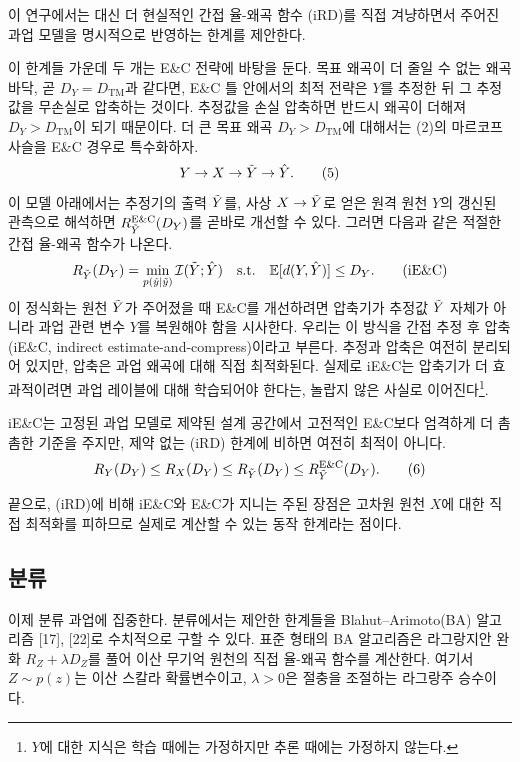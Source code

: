 이 연구에서는 대신 더 현실적인 간접 율-왜곡 함수 (iRD)를 직접 겨냥하면서 주어진 과업 모델을 명시적으로 반영하는 한계를 제안한다.

이 한계들 가운데 두 개는 E\&C 전략에 바탕을 둔다. 목표 왜곡이 더 줄일 수 없는 왜곡 바닥, 곧 $D_Y=D_{\mathrm{TM}}$과 같다면, E\&C 틀 안에서의 최적 전략은 $Y$를 추정한 뒤 그 추정값을 무손실로 압축하는 것이다. 추정값을 손실 압축하면 반드시 왜곡이 더해져 $D_Y>D_{\mathrm{TM}}$이 되기 때문이다. 더 큰 목표 왜곡 $D_Y>D_{\mathrm{TM}}$에 대해서는 (2)의 마르코프 사슬을 E\&C 경우로 특수화하자.
\begin{equation}
Y\to X\to\tilde{Y}\to\hat{Y}.\tag{5}
\end{equation}
이 모델 아래에서는 추정기의 출력 $\tilde{Y}$를, 사상 $X\to\tilde{Y}$로 얻은 원격 원천 $Y$의 갱신된 관측으로 해석하면 $R_{\tilde{Y}}^{\mathrm{E\&C}}(D_Y)$를 곧바로 개선할 수 있다. 그러면 다음과 같은 적절한 간접 율-왜곡 함수가 나온다.
\begin{equation}
R_{\tilde{Y}}(D_Y)=\min_{p(\hat y|\tilde y)}\mathcal{I}(\tilde{Y};\hat{Y})\quad\text{s.t.}\quad\mathbb{E}[d(Y,\hat{Y})]\le D_Y.\tag{iE\&C}
\end{equation}
이 정식화는 원천 $\tilde{Y}$가 주어졌을 때 E\&C를 개선하려면 압축기가 추정값 $\tilde{Y}$ 자체가 아니라 과업 관련 변수 $Y$를 복원해야 함을 시사한다. 우리는 이 방식을 간접 추정 후 압축(iE\&C, indirect estimate-and-compress)이라고 부른다. 추정과 압축은 여전히 분리되어 있지만, 압축은 과업 왜곡에 대해 직접 최적화된다. 실제로 iE\&C는 압축기가 더 효과적이려면 과업 레이블에 대해 학습되어야 한다는, 놀랍지 않은 사실로 이어진다\footnote{$Y$에 대한 지식은 학습 때에는 가정하지만 추론 때에는 가정하지 않는다.}.

iE\&C는 고정된 과업 모델로 제약된 설계 공간에서 고전적인 E\&C보다 엄격하게 더 촘촘한 기준을 주지만, 제약 없는 (iRD) 한계에 비하면 여전히 최적이 아니다.
\begin{equation}
R_Y(D_Y)\le R_X(D_Y)\le R_{\tilde{Y}}(D_Y)\le R_{\tilde{Y}}^{\mathrm{E\&C}}(D_Y).\tag{6}
\end{equation}

끝으로, (iRD)에 비해 iE\&C와 E\&C가 지니는 주된 장점은 고차원 원천 $X$에 대한 직접 최적화를 피하므로 실제로 계산할 수 있는 동작 한계라는 점이다.

\subsection{분류}
이제 분류 과업에 집중한다. 분류에서는 제안한 한계들을 Blahut--Arimoto(BA) 알고리즘 [17], [22]로 수치적으로 구할 수 있다. 표준 형태의 BA 알고리즘은 라그랑지안 완화 $R_Z+\lambda D_Z$를 풀어 이산 무기억 원천의 직접 율-왜곡 함수를 계산한다. 여기서 $Z\sim p(z)$는 이산 스칼라 확률변수이고, $\lambda>0$은 절충을 조절하는 라그랑주 승수이다.

